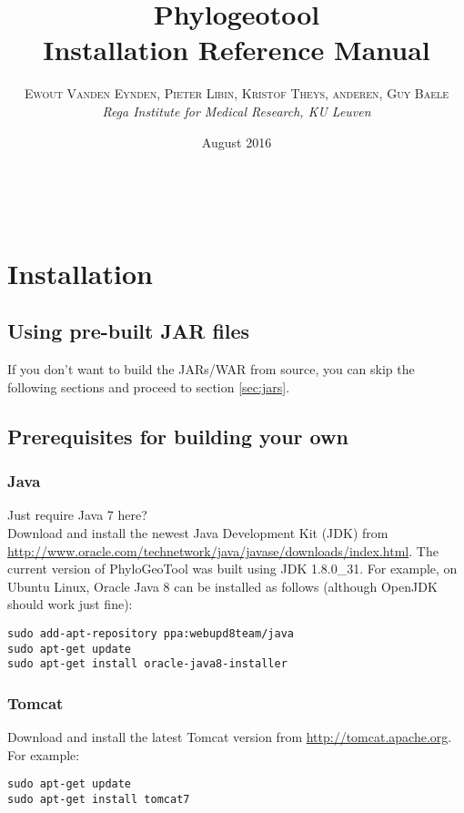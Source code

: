 \documentclass[a4paper, 11pt]{article} %
\title{\textbf{Phylogeotool}\\ %
Installation Reference Manual} %
\author{\textsc{Ewout Vanden Eynden, Pieter Libin, Kristof Theys, anderen, Guy Baele} %
\\{\textit{Rega Institute for Medical Research, KU Leuven}}} %
\date{August 2016} %
\makeatletter
\renewcommand{\maketitle}{ %
\begin{flushright} %
{\LARGE\@title} %

\vspace{50pt} %

{\large\@author} %
\\\@date %

\vspace{40pt} %
\end{flushright}
}
\makeatother
\begin{document}
\maketitle %

\vspace{30pt} %

\tableofcontents
\newpage

\section{Installation}

\subsection{Using pre-built JAR files}
If you don't want to build the JARs/WAR from source, you can skip the following sections and proceed to section \ref{sec:jars}.


\subsection{Prerequisites for building your own}

\subsubsection*{Java}
Just require Java 7 here?\\

Download and install the newest Java Development Kit (JDK) from \url{http://www.oracle.com/technetwork/java/javase/downloads/index.html}.
The current version of PhyloGeoTool was built using JDK 1.8.0\_31.
For example, on Ubuntu Linux, Oracle Java 8 can be installed as follows (although OpenJDK should work just fine):
\begin{verbatim} 
sudo add-apt-repository ppa:webupd8team/java
sudo apt-get update
sudo apt-get install oracle-java8-installer
\end{verbatim}

\subsubsection*{Tomcat}
Download and install the latest Tomcat version from \url{http://tomcat.apache.org}.
For example:
\begin{verbatim}
sudo apt-get update
sudo apt-get install tomcat7
\end{verbatim}
\end{document}
